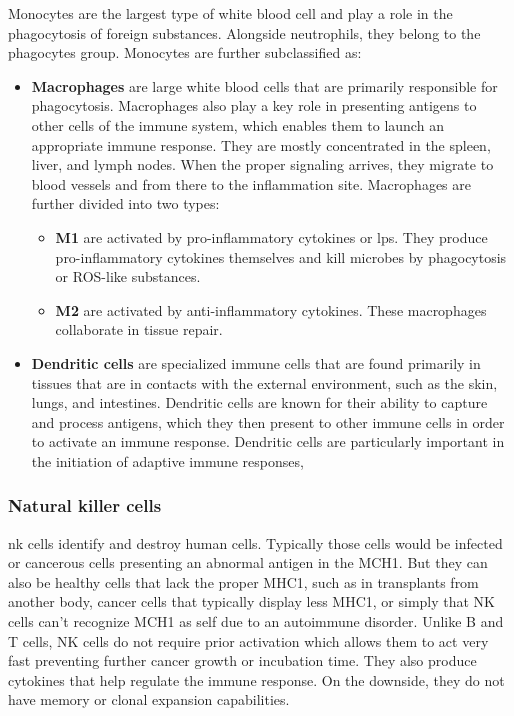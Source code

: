     Monocytes are the largest type of white blood cell and play a role in the phagocytosis of foreign substances. Alongside neutrophils, they belong to the phagocytes group. Monocytes are further subclassified as:

    \begin{itemize}
        
        \item{\textbf{Macrophages}} are large white blood cells that are primarily responsible for phagocytosis. Macrophages also play a key role in presenting antigens to other cells of the immune system, which enables them to launch an appropriate immune response. They are mostly concentrated in the spleen, liver, and lymph nodes. When the proper signaling arrives, they migrate to blood vessels and from there to the inflammation site. Macrophages are further divided into two types:

            \begin{itemize}

                \item{\textbf{M1}} are activated by pro-inflammatory cytokines or \gls{lps}. They produce pro-inflammatory cytokines themselves and kill microbes by phagocytosis or ROS-like substances.
                
                \item{\textbf{M2}} are activated by anti-inflammatory cytokines. These macrophages collaborate in tissue repair.

            \end{itemize}
            
        \item{\textbf{Dendritic cells}} are specialized immune cells that are found primarily in tissues that are in contacts with the external environment, such as the skin, lungs, and intestines. Dendritic cells are known for their ability to capture and process antigens, which they then present to other immune cells in order to activate an immune response. Dendritic cells are particularly important in the initiation of adaptive immune responses,

    \end{itemize}

\subsubsection{Natural killer cells}

\gls{nk} cells identify and destroy human cells. Typically those cells would be infected or cancerous cells presenting an abnormal antigen in the MCH1. But they can also be healthy cells that lack the proper MHC1, such as in transplants from another body, cancer cells that typically display less MHC1, or simply that NK cells can't recognize MCH1 as self due to an autoimmune disorder. Unlike B and T cells, NK cells do not require prior activation which allows them to act very fast preventing further cancer growth or incubation time. They also produce cytokines that help regulate the immune response. On the downside, they do not have memory or clonal expansion capabilities.

